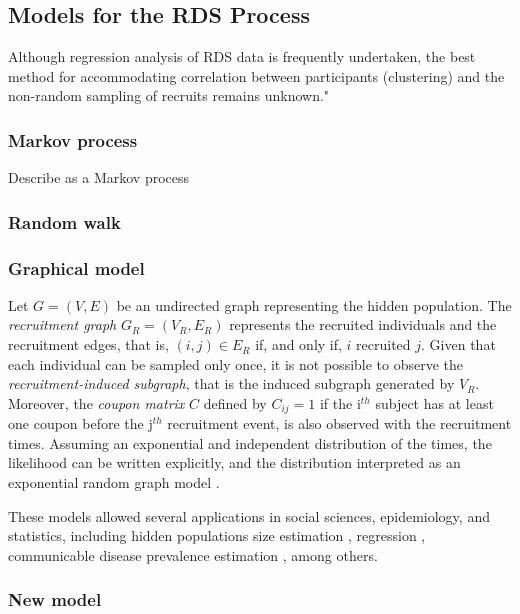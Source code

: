 \subsection{Models for the RDS Process}
\label{sec:models-rds-process}

Although regression analysis of RDS data is frequently undertaken, the best method for accommodating
  correlation between participants (clustering) and the non-random sampling of
  recruits remains unknown."

\subsubsection{Markov process}

Describe as a Markov process \cite{heckathorn1997}

\subsubsection{Random walk}

\cite{salganik2004sampling}

\subsubsection{Graphical model}

Let $G = (V,E)$ be an undirected graph representing the hidden population. The {\em recruitment graph} $G_R =
(V_R, E_R)$ represents the recruited individuals and the recruitment edges,
that is, $(i,j) \in E_R$ if, and only if, $i$ recruited $j$.
Given that each individual can be sampled only once, it is not possible to
observe the {\em recruitment-induced subgraph}, that is the induced subgraph
generated by $V_R$. Moreover, the {\em coupon matrix} $C$ defined by $C_{ij} =
1$ if the i$^{th}$ subject has at least one coupon before the j$^{th}$
recruitment event, is also observed with the recruitment times. Assuming an
exponential and independent distribution of the times, the likelihood can be
written explicitly, and the distribution interpreted as an exponential random graph
model \cite[]{crawford2016}.  

These models allowed several applications in social sciences, epidemiology,
and statistics, including hidden populations size estimation
\cite[]{crawford2018hidden}, regression \cite[]{bastos2012binary}, communicable
disease prevalence estimation \cite[]{albuquerque2009avaliaccao}, among
others.

\subsubsection{New model}

